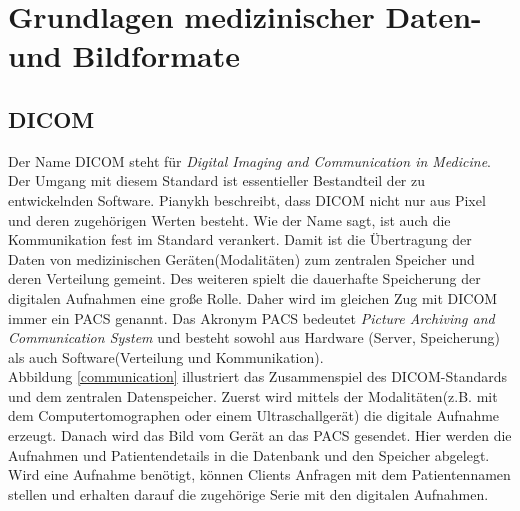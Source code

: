 \chapter{Grundlagen medizinischer Daten- und Bildformate} \label{grundlagen}


\section{DICOM}\label{grundlagen:dicom}
Der Name DICOM steht für \textit{Digital Imaging and Communication in Medicine}. Der Umgang mit diesem Standard ist essentieller Bestandteil der zu entwickelnden Software. Pianykh\cite[1]{pianykh:dicom} beschreibt, dass DICOM nicht nur aus Pixel und deren zugehörigen Werten besteht. Wie der Name sagt, ist auch die Kommunikation fest im Standard verankert. Damit ist die Übertragung der Daten von medizinischen Geräten(Modalitäten) zum zentralen Speicher und deren Verteilung gemeint. Des weiteren spielt die dauerhafte Speicherung der digitalen Aufnahmen eine große Rolle. Daher wird im gleichen Zug mit DICOM immer ein PACS genannt. Das Akronym PACS bedeutet \textit{Picture Archiving and Communication System} und besteht sowohl aus Hardware (Server, Speicherung) als auch Software(Verteilung und Kommunikation).\\
Abbildung \ref{communication} illustriert das Zusammenspiel des DICOM-Standards und dem zentralen Datenspeicher. Zuerst wird mittels der Modalitäten(z.B. mit dem Computertomographen oder einem Ultraschallgerät) die digitale Aufnahme erzeugt. Danach wird das Bild vom Gerät an das PACS gesendet. Hier werden die Aufnahmen und Patientendetails in die Datenbank und den Speicher abgelegt. Wird eine Aufnahme benötigt, können Clients Anfragen mit dem Patientennamen stellen und erhalten darauf die zugehörige Serie mit den digitalen Aufnahmen.


